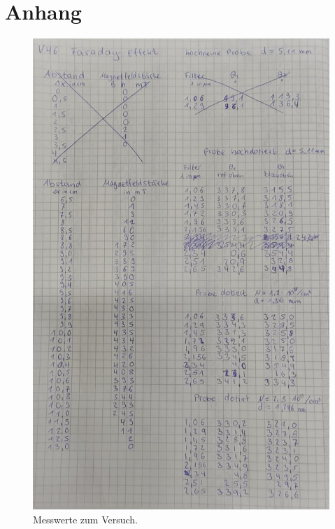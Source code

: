 \section{Anhang}\label{sec:Anhang}
\begin{figure}[h]
   \centering
    \includegraphics[scale=0.45]{Abbildungen/Kladde.jpg}
   \caption{Messwerte zum Versuch.}
\end{figure}
\pagebreak